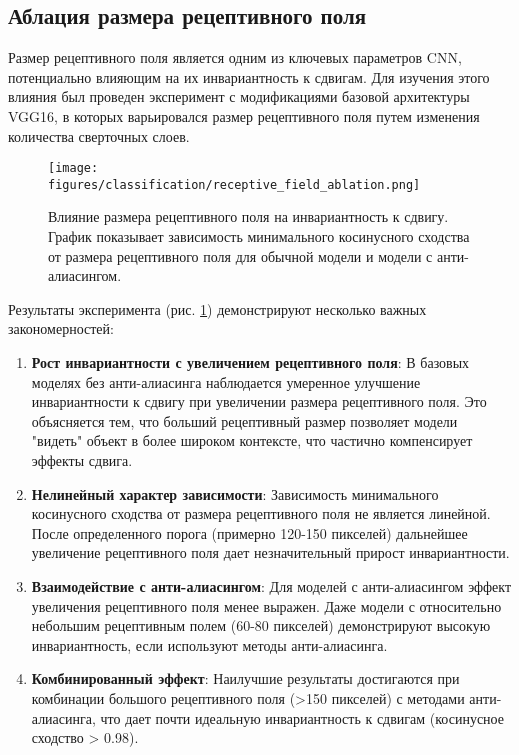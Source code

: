 \subsection{Аблация размера рецептивного поля}
\label{experiments:ablation:receptive_field}

Размер рецептивного поля является одним из ключевых параметров CNN, потенциально влияющим на их инвариантность к сдвигам. Для изучения этого влияния был проведен эксперимент с модификациями базовой архитектуры VGG16, в которых варьировался размер рецептивного поля путем изменения количества сверточных слоев.

\begin{figure}[ht]
\centering
\texttt{[image: figures/classification/receptive\_field\_ablation.png]}
\caption{Влияние размера рецептивного поля на инвариантность к сдвигу. График показывает зависимость минимального косинусного сходства от размера рецептивного поля для обычной модели и модели с анти-алиасингом.}
\label{fig:receptive_field_ablation}
\end{figure}

Результаты эксперимента (рис. \ref{fig:receptive_field_ablation}) демонстрируют несколько важных закономерностей:

\begin{enumerate}
    \item \textbf{Рост инвариантности с увеличением рецептивного поля}: В базовых моделях без анти-алиасинга наблюдается умеренное улучшение инвариантности к сдвигу при увеличении размера рецептивного поля. Это объясняется тем, что больший рецептивный размер позволяет модели "видеть" объект в более широком контексте, что частично компенсирует эффекты сдвига.
    
    \item \textbf{Нелинейный характер зависимости}: Зависимость минимального косинусного сходства от размера рецептивного поля не является линейной. После определенного порога (примерно 120-150 пикселей) дальнейшее увеличение рецептивного поля дает незначительный прирост инвариантности.
    
    \item \textbf{Взаимодействие с анти-алиасингом}: Для моделей с анти-алиасингом эффект увеличения рецептивного поля менее выражен. Даже модели с относительно небольшим рецептивным полем (60-80 пикселей) демонстрируют высокую инвариантность, если используют методы анти-алиасинга.
    
    \item \textbf{Комбинированный эффект}: Наилучшие результаты достигаются при комбинации большого рецептивного поля (>150 пикселей) с методами анти-алиасинга, что дает почти идеальную инвариантность к сдвигам (косинусное сходство > 0.98).
\end{enumerate}


